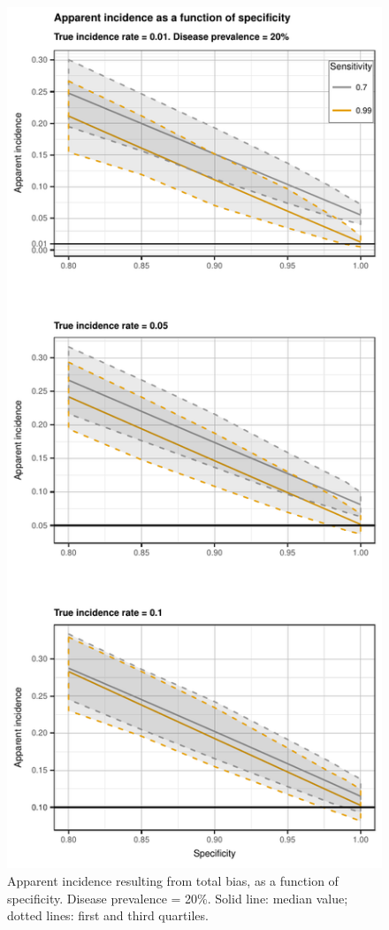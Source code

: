 \documentclass[utf8]{frontiersSCNS}\usepackage[]{graphicx}\usepackage[]{color}
\begin{document}
\begin{figure}[htbp]
  \begin{center}
    \includegraphics[scale=.95]{master-dohoo20_incidence-1}
    \end{center}
  \caption{Apparent incidence resulting from total bias, as a function of
    specificity. Disease prevalence = 20\%. Solid line: median value; dotted
    lines: first and third quartiles.}
  \label{fig:apparent_incidence_20}
\end{figure}
\end{document}
